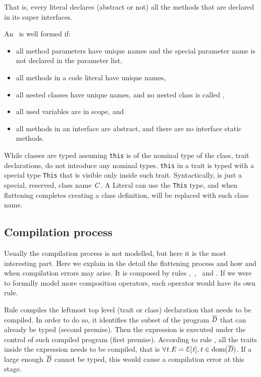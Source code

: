 \noindent That is, every literal declares (abstract or not) all the methods that are declared 
in its super interfaces.

\noindent An \mL\ is well formed if:
\begin{itemize}
\item all method parameters have unique names and the special parameter name \Q@this@ is not declared
 in the parameter list,
\item all methods in a code literal have unique names,
\item all nested classes have unique names, and no nested class is called \Q@This@,
\item all used variables are in scope, and
\item all methods in an interface are abstract, and there are no interface static methods.
\end{itemize}


While classes are typed assuming \lstinline{this} is of the nominal type of the
class, trait declarations, do not introduce any nominal types.  \lstinline{this}
in a trait is typed with a special type \lstinline{This} that is visible only
inside such trait. Syntactically, \Q@This@ is just a special, reserved, class name $\mathit{C}$.
A Literal can use the \lstinline{This} type,
and when flattening completes creating a class definition, \Q@This@ will be replaced with such class name.


\subsection{Compilation process}

Usually the compilation process is not modelled, but here it is the most interesting part.
Here we explain in the detail the flattening process and how and when compilation errors may arise.
It is composed by rules ,\ ,\  and .
If we were to formally model more composition operators, each operator would have its own  rule.

Rule 
compiles the leftmost top level (trait or class) declaration that needs to be compiled.
In order to do so,
it identifies the subset of the program $\overline{\mathit{D}}$ that can already be typed (second premise).
Then the expression is executed under the control of such compiled program (first premise).
According to rule , all the traits inside the expression needs to
be compiled, that is $\forall\mathit{t}. \mathit{E}={\cal{E}}[\mathit{t}], \mathit{t}\in\text{dom}(\overline{\mathit{D}})$.
If a large enough $\overline{\mathit{D}}$ cannot be typed, this would cause a compilation error
at this stage.

